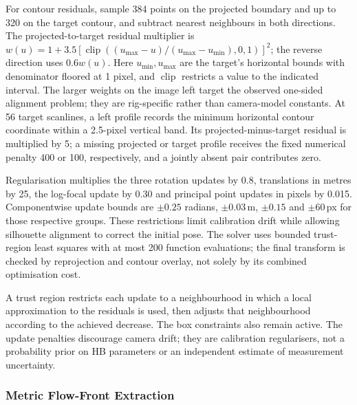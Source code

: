 For contour residuals, sample 384 points on the projected boundary and
up to 320 on the target contour, and subtract nearest neighbours in
both directions. The projected-to-target residual multiplier is
$w(u)=1+3.5[\operatorname{clip}((u_{\max}-u)/(u_{\max}-u_{\min}),0,1)]^2$;
the reverse direction uses $0.6w(u)$. Here $u_{\min},u_{\max}$ are
the target's horizontal bounds with denominator floored at 1 pixel,
and $\operatorname{clip}$ restricts a value to the indicated interval.
The larger weights on the image left target the observed one-sided
alignment problem; they are rig-specific rather than camera-model
constants. At 56 target scanlines, a left profile records the minimum
horizontal contour coordinate within a 2.5-pixel vertical band. Its
projected-minus-target residual is multiplied by 5; a missing projected
or target profile receives the fixed numerical penalty 400 or 100,
respectively, and a jointly absent pair contributes zero.

Regularisation multiplies the three rotation updates by 0.8,
translations in metres by 25, the log-focal update by 0.30 and principal
point updates in pixels by 0.015. Componentwise update bounds are
$\pm0.25$ radians, $\pm0.03$\,m, $\pm0.15$ and $\pm60$\,px for
those respective groups. These restrictions limit calibration drift
while allowing silhouette alignment to correct the initial pose.
The solver uses bounded trust-region least squares with at most 200
function evaluations; the final transform is checked by reprojection
and contour overlay, not solely by its combined optimisation cost.

A trust region restricts each update to a neighbourhood in which a
local approximation to the residuals is used, then adjusts that
neighbourhood according to the achieved decrease. The box constraints
also remain active. The update penalties discourage camera drift;
they are calibration regularisers, not a probability prior on HB
parameters or an independent estimate of measurement uncertainty.


\subsubsection{Metric Flow-Front Extraction}
\label{sec:metric-front}

